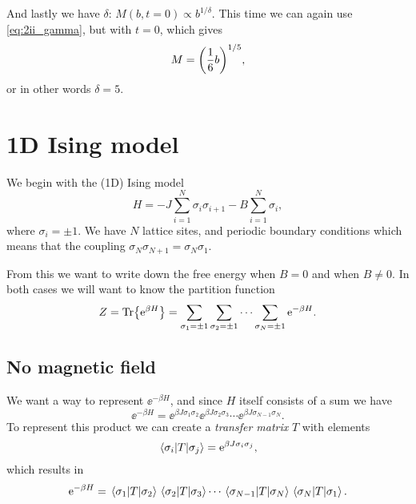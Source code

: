 \documentclass[11pt,letter, swedish, english
]{article}
\begin{document}
And lastly we have $\delta$: $M(b,t=0)\propto b^{1/\delta}$. This time
we can again use \eqref{eq:2ii_gamma}, but with $t=0$, which gives
\begin{equation}
M=\qty(\frac{1}{6}b)^{1/5},
\end{equation}
or in other words $\delta=5$.



\section{1D Ising model}
We begin with the (1D) Ising model
\begin{equation}\label{eq:3_H}
H=-J\sum_{i=1}^{N}\sigma_{i}\sigma_{i+1}-B\sum_{i=1}^N\sigma_i,
\end{equation}
where $\sigma_i=\pm1$. We have $N$ lattice sites, and periodic
boundary conditions which means that the coupling
$\sigma_N\sigma_{N+1}=\sigma_N\sigma_1$. 

From this we want to write down the free
energy when $B=0$ and when $B\neq0$. In both cases we will want to
know the partition function
\begin{equation}\label{eq:3_Z}
Z=\Tr{\mathrm{e}^{\beta H}}
=\sum_{\sigma_1=\pm1}\sum_{\sigma_2=\pm1}\cdots\sum_{\sigma_N=\pm1}\mathrm{e}^{-\beta H}.
\end{equation}

\subsection{No magnetic field}
We want a way to represent $\ee^{-\beta H}$, and since $H$ itself
consists of a sum we have
\begin{equation}
\ee^{-\beta H}=
\ee^{\beta J\sigma_1\sigma_2}\ee^{\beta J\sigma_2\sigma_3}
\cdots\ee^{\beta J\sigma_{N-1}\sigma_N}.
\end{equation}
To represent this product we can create a \emph{transfer matrix}
$T$ with elements
\begin{equation}\label{eq:3_T_sigma}
\mel{\sigma_i}{T}{\sigma_j}=\mathrm{e}^{\beta J\sigma_i\sigma_j},
\end{equation}
which results in
\begin{equation}\label{eq:3_e^H_mel}
\mathrm{e}^{-\beta H}=\mel{\sigma_1}{T}{\sigma_2}\mel{\sigma_2}{T}{\sigma_3}
\cdots\mel{\sigma_{N-1}}{T}{\sigma_N}\mel{\sigma_{N}}{T}{\sigma_1}.
\end{equation}
\end{document}
